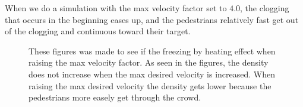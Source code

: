 When we do a simulation with the max velocity factor set to $4.0$, the clogging
that occurs in the beginning eases up, and the pedestrians relatively fast
get out of the clogging and continuous toward their target.

\begin{figure}
\centering
{}
\caption{These figures was made to see if the freezing by heating effect when raising the max velocity factor. As seen in the figures, the
density does not increase when the max desired velocity is increased. When raising the max desired velocity the density gets lower because
the pedestrians more easely get through the crowd.}
\label{fig:freezingbyheating}
\end{figure}

